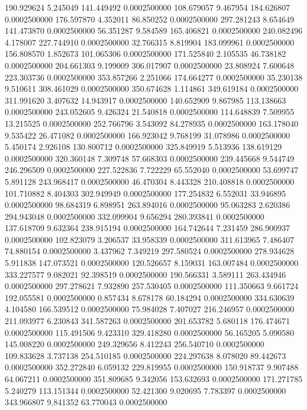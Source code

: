190.929624 5.245049 141.449492 0.0002500000
108.679057 9.467954 184.626807 0.0002500000
176.597870 4.352011 86.850252 0.0002500000
297.281243 8.654649 141.473870 0.0002500000
56.351287 9.584589 165.406821 0.0002500000
240.082496 4.178007 227.744910 0.0002500000
32.766315 8.819904 183.099961 0.0002500000
156.808570 1.852673 101.065306 0.0002500000
171.525840 2.105535 46.738182 0.0002500000
204.661303 9.199009 306.017907 0.0002500000
23.808924 7.600648 223.303736 0.0002500000
353.857266 2.251066 174.664277 0.0002500000
35.230138 9.510611 308.461029 0.0002500000
350.674628 1.114861 349.619184 0.0002500000
311.991620 3.407632 14.943917 0.0002500000
140.652909 9.867985 113.138663 0.0002500000
243.052605 9.426324 21.540818 0.0002500000
114.648839 7.509955 13.215525 0.0002500000
252.766796 3.543092 84.278935 0.0002500000
163.178040 9.535422 26.471082 0.0002500000
166.923042 9.768199 31.078986 0.0002500000
5.450174 2.926108 130.800712 0.0002500000
325.849919 5.513936 138.619129 0.0002500000
320.360148 7.309748 57.668303 0.0002500000
239.445668 9.544749 246.296509 0.0002500000
227.522836 7.722229 65.552040 0.0002500000
53.699747 5.891128 243.968417 0.0002500000
46.470304 8.443328 210.408818 0.0002500000
101.710882 8.404303 302.949949 0.0002500000
177.254832 6.552031 33.946895 0.0002500000
98.684319 6.898951 263.894016 0.0002500000
95.063283 2.620386 294.943048 0.0002500000
332.099904 9.656294 280.393841 0.0002500000
137.618709 9.632364 238.915194 0.0002500000
164.742644 7.231459 286.900937 0.0002500000
102.823079 3.206537 33.958339 0.0002500000
311.613965 7.486407 74.880154 0.0002500000
3.437962 7.349219 297.580524 0.0002500000
278.934628 5.911838 147.073521 0.0002500000
120.526657 8.159031 163.007484 0.0002500000
333.227577 9.082021 92.398519 0.0002500000
190.566331 3.589111 263.434946 0.0002500000
297.278621 7.932890 257.530405 0.0002500000
111.350663 9.661724 192.055581 0.0002500000
0.857434 8.678178 60.184294 0.0002500000
334.630639 4.104580 166.539512 0.0002500000
75.984028 7.407027 216.246957 0.0002500000
211.093977 6.230843 341.587263 0.0002500000
201.653782 5.680118 176.474671 0.0002500000
115.491506 9.423310 329.418280 0.0002500000
56.165205 5.090580 145.008220 0.0002500000
249.329656 8.412243 256.540710 0.0002500000
109.833628 3.737138 254.510185 0.0002500000
224.297638 8.078020 89.442673 0.0002500000
352.272840 6.059132 229.819955 0.0002500000
150.918737 9.907488 64.067211 0.0002500000
351.809685 9.342056 153.632693 0.0002500000
171.271785 5.240279 113.151344 0.0002500000
52.421300 9.020695 7.783397 0.0002500000
343.966807 9.841352 63.770043 0.0002500000
